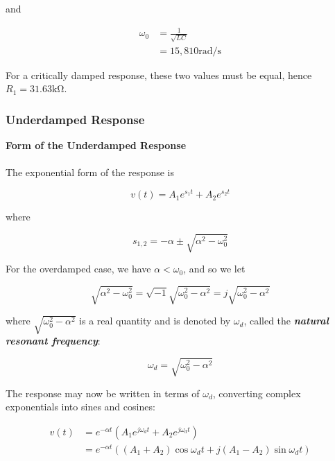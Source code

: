 \documentclass[11pt]{article}
\numberwithin{equation}{section}
\begin{document}
\begin{flushleft}
\begin{tcolorbox}[colback=SkyBlue!5, colframe=SkyBlue!75!black, title=\textbf{Example 3.2}, breakable]
and

\begin{align*}
\omega_0 &= \frac{1}{\sqrt{LC}} \\
&= 15,810 \si{\radian\per\second}
\end{align*}

For a critically damped response, these two values must be equal, hence $R_1 = 31.63 \si{\kilo\ohm}$.
\end{tcolorbox}

\color{blue}
\subsubsection{Underdamped Response}
\textbf{Form of the Underdamped Response}
\color{black}
\\~\\
The exponential form of the response is

\begin{equation*}
v(t) = A_1e^{s_1t} + A_2e^{s_2t}
\end{equation*}

where

\begin{equation*}
s_{1,2} = -\alpha \pm \sqrt{\alpha^2 - \omega_0^2}
\end{equation*}

For the overdamped case, we have $\alpha < \omega_0$, and so we let

\begin{equation*}
\sqrt{\alpha^2 - \omega_0^2} = \sqrt{-1}\sqrt{\omega_0^2 - \alpha^2} = j\sqrt{\omega_0^2 - \alpha^2}
\end{equation*}

where $\sqrt{\omega_0^2 - \alpha^2}$ is a real quantity and is denoted by $\omega_d$, called the \textit{\textbf{natural resonant frequency}}:

\begin{equation*}
\omega_d = \sqrt{\omega_0^2 - \alpha^2}
\end{equation*}

The response may now be written in terms of $\omega_d$, converting complex exponentials into sines and cosines:

\begin{align*}
v(t) &= e^{-\alpha t}(A_1e^{j\omega_dt} + A_2e^{j\omega_dt})\\
&= e^{-\alpha t}((A_1 + A_2)\cos{\omega_dt} + j(A_1 - A_2)\sin{\omega_dt})
\end{align*}


\end{flushleft}
\end{document}

